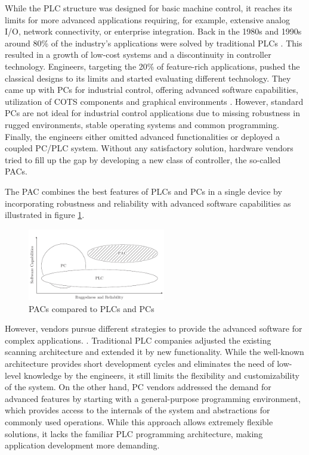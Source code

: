 While the \ac{PLC} structure was designed for basic machine control, it
reaches its limits for more advanced applications requiring, for example,
extensive analog I/O, network connectivity, or enterprise integration. Back in
the 1980s and 1990s around 80\% of the industry's applications were solved by
traditional \acp{PLC} \citep{bel05}. This resulted in a growth of low-cost
systems and a discontinuity in controller technology. Engineers, targeting the
20\% of feature-rich applications, pushed the classical designs to its limits
and started evaluating different technology. They came up with \acp{PC} for
industrial control, offering advanced software capabilities, utilization of
\ac{COTS} components and graphical environments \citep{bel05}. However,
standard \acp{PC} are not ideal for industrial control applications due to
missing robustness in rugged environments, stable operating systems and common
programming. Finally, the engineers either omitted advanced functionalities or
deployed a coupled \ac{PC}/\ac{PLC} system. Without any satisfactory solution,
hardware vendors tried to fill up the gap by developing a new class of
controller, the so-called \acp{PAC}.

The \ac{PAC} combines the best features of \acp{PLC} and \acp{PC} in a single
device by incorporating robustness and reliability with advanced software
capabilities as illustrated in figure \ref{fig:pac}.
\begin{figure}[tb]
	\centering
	\includegraphics[width=6cm]{../figures/pac}
	\caption{\acsp{PAC} compared to \acsp{PLC} and \acsp{PC} \citep[adapted from][]{bel05}}
	\label{fig:pac}
\end{figure}
However, vendors pursue different strategies to provide the advanced software
for complex applications. \citep{bel05}. Traditional \ac{PLC} companies
adjusted the existing scanning architecture and extended it by new
functionality. While the well-known architecture provides short development
cycles and eliminates the need of low-level knowledge by the engineers, it
still limits the flexibility and customizability of the system. On the other
hand, \ac{PC} vendors addressed the demand for advanced features by starting
with a general-purpose programming environment, which provides access to the
internals of the system and abstractions for commonly used operations. While
this approach allows extremely flexible solutions, it lacks the familiar
\ac{PLC} programming architecture, making application development more
demanding.


